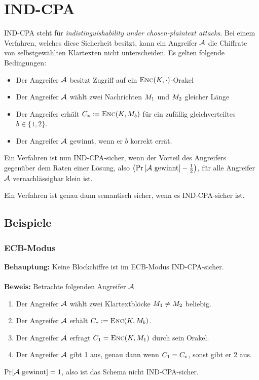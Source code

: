 \section{IND-CPA}
\label{IND-CPA}
IND-CPA steht für \emph{indistinguishability under chosen-plaintext attacks}. Bei einem Verfahren, welches diese Sicherheit besitzt, kann ein Angreifer $\mathcal{A}$
die Chiffrate von selbstgewählten Klartexten nicht unterscheiden. Es gelten folgende Bedingungen:
\begin{itemize}
\item Der Angreifer $\mathcal{A}$ besitzt Zugriff auf ein $\textsc{Enc}(K,\cdot)$-Orakel
\item Der Angreifer $\mathcal{A}$ wählt zwei Nachrichten $M_1$ und $M_2$ gleicher Länge
\item Der Angreifer erhält $C_* := \textsc{Enc}(K, M_{b})$  für ein zufällig gleichverteiltes $b \in \{1, 2\}$.
\item Der Angreifer $\mathcal{A}$ gewinnt, wenn er $b$ korrekt errät.
\end{itemize}
Ein Verfahren ist nun IND-CPA-sicher, wenn der Vorteil des Angreifers gegenüber dem Raten einer Lösung, also $ \left( \text{Pr} \left[ \mathcal{A} \text{
gewinnt} \right] - \frac{1}{2} \right)$, für alle Angreifer $\mathcal{A}$ vernachlässigbar klein ist.
\vspace{10pt}

\begin{theorem}
Ein Verfahren ist genau dann semantisch sicher, wenn es IND-CPA-sicher ist.
\end{theorem}

\subsection{Beispiele}
\subsubsection{ECB-Modus}
\textbf{Behauptung:} Keine Blockchiffre ist im ECB-Modus IND-CPA-sicher.~\\\\
\textbf{Beweis:} Betrachte folgenden Angreifer $\mathcal{A}$
\begin{enumerate}[Schr{i}tt 1:]
    \item Der Angreifer $\mathcal{A}$ wählt zwei Klartextblöcke $M_1 \neq M_2$ beliebig.
    \item Der Angreifer $\mathcal{A}$ erhält $C_* := \textsc{Enc}(K, M_{b})$.
    \item Der Angreifer $\mathcal{A}$ erfragt $C_1 = \textsc{Enc}(K, M_1)$ durch sein Orakel.
    \item Der Angreifer $\mathcal{A}$ gibt 1 aus, genau dann wenn $C_1 = C_*$, sonst gibt er 2 aus.
\end{enumerate}
Pr$\left[ \mathcal{A} \text{ gewinnt} \right] = 1$, also ist das Schema nicht IND-CPA-sicher.

